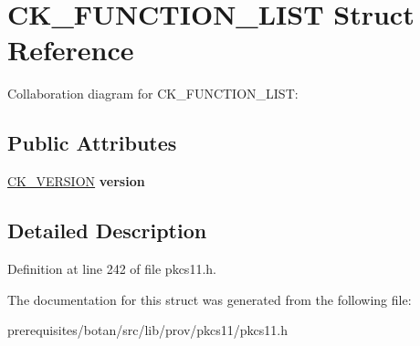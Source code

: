 \hypertarget{struct_c_k___f_u_n_c_t_i_o_n___l_i_s_t}{}\section{C\+K\+\_\+\+F\+U\+N\+C\+T\+I\+O\+N\+\_\+\+L\+I\+ST Struct Reference}
\label{struct_c_k___f_u_n_c_t_i_o_n___l_i_s_t}


Collaboration diagram for C\+K\+\_\+\+F\+U\+N\+C\+T\+I\+O\+N\+\_\+\+L\+I\+ST\+:
\subsection*{Public Attributes}
\begin{DoxyCompactItemize}
\item 
\mbox{\label{struct_c_k___f_u_n_c_t_i_o_n___l_i_s_t_a2588758f026a49100546d9868754a6c8}} 
\mbox{\hyperlink{struct_c_k___v_e_r_s_i_o_n}{C\+K\+\_\+\+V\+E\+R\+S\+I\+ON}} {\bfseries version}
\end{DoxyCompactItemize}


\subsection{Detailed Description}


Definition at line 242 of file pkcs11.\+h.



The documentation for this struct was generated from the following file\+:\begin{DoxyCompactItemize}
\item 
prerequisites/botan/src/lib/prov/pkcs11/pkcs11.\+h\end{DoxyCompactItemize}
